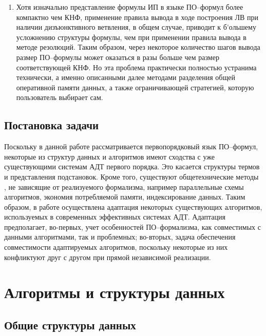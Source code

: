\begin{enumerate}
\item Хотя изначально представление формулы ИП в языке ПО--формул более компактно чем КНФ, применение правила вывода в ходе построения ЛВ при наличии дизъюнктивного ветвления, в общем случае, приводит к б\'{}ольшему усложнению структуры формулы, чем при применении правила вывода в методе резолюций. Таким образом, через некоторое количество шагов вывода размер ПО--формулы может оказаться в разы больше чем размер соответствующей КНФ. Но эта проблема практически полностью устранима технически, а именно описанными далее методами разделения общей оперативной памяти данных, а также ограничивающей стратегией, которую пользователь выбирает сам.
\end{enumerate}


\subsection{Постановка задачи}
Поскольку в данной работе рассматривается первопорядковый язык ПО--формул, некоторые из структур данных и алгоритмов имеют сходства с уже существующими системам АДТ первого порядка. Это касается структуры термов и представления подстановок. Кроме того, существуют общетехнические методы , не зависящие от реализуемого формализма, например параллельные схемы алгоритмов, экономия потребляемой памяти, индексирование данных. Таким образом, в работе осуществлена адаптация некоторых существующих алгоритмов, используемых в современных эффективных системах АДТ. Адаптация предполагает, во-первых, учет особенностей ПО--формализма, как совместимых с данными алгоритмами, так и проблемных; во-вторых,  задача обеспечения совместимости адаптируемых алгоритмов, поскольку некоторые из них конфликтуют друг с другом при прямой независимой реализации.



\section{Алгоритмы и структуры данных}

\subsection{Общие структуры данных}

